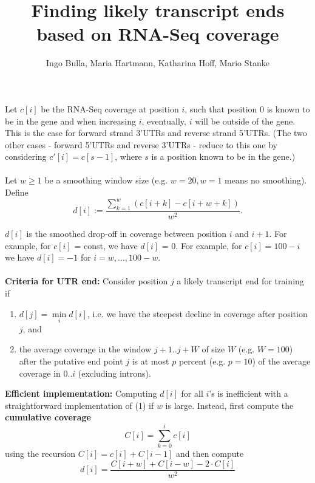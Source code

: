 \documentclass[pdftex,12pt,a4paper]{scrartcl}
\begin{document}
\title{Finding likely transcript ends based on RNA-Seq coverage}

\author{Ingo Bulla, Maria Hartmann, Katharina Hoff, Mario Stanke}

\maketitle

Let $c[i]$ be the RNA-Seq coverage at position $i$, such that position 0 is known to be in the gene and when increasing $i$, eventually, $i$ will be outside of the gene. This is the case for forward strand 3'UTRs and reverse strand 5'UTRs. (The two other cases - forward 5'UTRs and reverse 3'UTRs - reduce to this one by considering $c'[i] = c[s - 1]$, where $s$ is a position known to be in the gene.)\\
\\
Let $w \geq 1$ be a smoothing window size (e.g. $w = 20, w = 1$ means no smoothing). Define\\
\begin{equation}
 d[i] := \frac{\sum\limits_{k=1}^w(c[i+k] - c[i + w + k])}{w^2} . \end{equation}
 
$d[i]$ is the smoothed drop-off in coverage between position $i$ and $i+1$. For example, for $c[i]$ = const, we have $d[i]$ = 0. For example, for $c[i] = 100 - i$ we have $d[i] = -1$ for $i = w,...,100 - w$. \\
\\
\textbf{Criteria for UTR end:} Consider position $j$ a likely transcript end for training if
\begin{enumerate}
\item $d[j] = \min\limits_i d[i]$, i.e. we have the steepest decline in coverage after position $j$, and
\item the average coverage in the window $j + 1 .. j + W$ of size $W$ (e.g. $W = 100$) after the putative end point $j$ is at most $p$ percent (e.g. $p = 10$) of the average coverage in $0..i$ (excluding introns).\end{enumerate}

\textbf{Efficient implementation:} Computing $d[i]$ for all $i$'s is inefficient with a straightforward implementation of (1) if $w$ is large. Instead, first compute the \textbf{cumulative coverage}
\[ C[i] = \sum\limits_{k=0}^i c[i] \]
using the recursion $C[i] = c[i] + C[i-1]$ and then compute
\begin{equation}
d[i] = \frac{C[i+w]+C[i-w]-2 \cdot C[i]}{w^2}
\end{equation}
\end{document}
